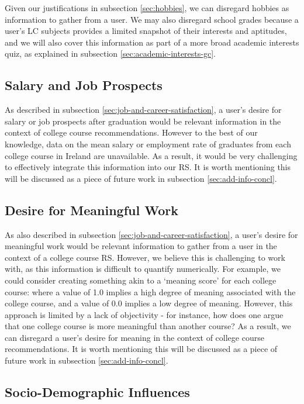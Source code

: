 Given our justifications in subsection \ref{sec:hobbies}, we can disregard hobbies as information to gather from a user.
We may also disregard school grades because a user's LC subjects provides a limited snapshot of their interests and aptitudes,
and we will also cover this information as part of a more broad academic interests quiz,
as explained in subsection \ref{sec:academic-interests-gc}.

\subsection{Salary and Job Prospects}
\label{sec:salary-design}

As described in subsection \ref{sec:job-and-career-satisfaction}, a user's desire for salary or job prospects after graduation would be relevant information in the context of college course recommendations.
However to the best of our knowledge, data on the mean salary or employment rate of graduates from each college course in Ireland
are unavailable. As a result, it would be very challenging to effectively integrate this information into our RS.
It is worth mentioning this will be discussed as a piece of future work in subsection \ref{sec:add-info-concl}.

\subsection{Desire for Meaningful Work}
\label{sec:meaning-design}

As also described in subsection \ref{sec:job-and-career-satisfaction}, a user's desire for meaningful work would be relevant information to gather from a user in the context of a college course RS.
However, we believe this is challenging to work with, 
as this information is difficult to quantify numerically.
For example, we could consider creating something akin to a `meaning score' for each college course: 
where a value of 1.0 implies a high degree of meaning associated with the college course,
and a value of 0.0 implies a low degree of meaning.
However, this approach is limited by a lack of objectivity - for instance, 
how does one argue that one college course is more meaningful than another course?
As a result, we can disregard a user's desire for meaning in the context of college course recommendations.
It is worth mentioning this will be discussed as a piece of future work in subsection \ref{sec:add-info-concl}.

\subsection{Socio-Demographic Influences}

